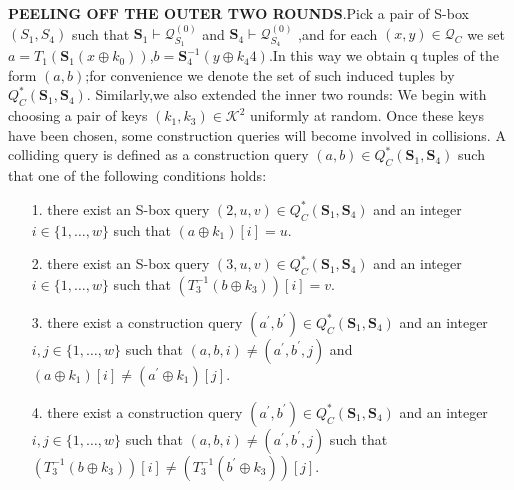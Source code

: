 \noindent
\textbf{PEELING OFF THE OUTER TWO ROUNDS}.Pick a pair of S-box $(S_1,S_4)$ such that $\mathbf{S}_{1} \vdash \mathcal{Q}_{S_{1}}^{(0)}$ and $\mathbf{S}_{4} \vdash
\mathcal{Q}_{S_{4}}^{(0)}$ ,and for each $(x, y) \in \mathcal{Q}_{C}$ we set $a=T_{1}\left(\mathbf{S}_{1}\left(x \oplus k_{0}\right)\right)$,$b=\mathbf{S}_{4}^{-1}\left(y \oplus k_{4}4\right)$.In this way we obtain q tuples of the form $(a,b)$;for convenience we denote the set of such induced tuples by $Q_{C}^{*}\left(\mathbf{S}_{1},\mathbf{S}_{4}\right)$. Similarly,we also extended the inner two rounds:
We begin with choosing a pair of keys $\left(k_{1}, k_{3}\right) \in \mathcal{K}^{2}$ uniformly at random. Once these keys have been chosen, some construction queries will become involved in collisions. A colliding query is defined as a construction query $(a, b) \in Q_{C}^{*}\left(\mathbf{S}_{1},\mathbf{S}_{4}\right)$ such that one of the following conditions holds:

\begin{itemize}
  \item[1.]
  there exist an S-box query $(2, u, v) \in Q_{C}^{*}\left(\mathbf{S}_{1},\mathbf{S}_{4}\right)$ and an integer $i \in\{1, \ldots, w\}$ such that $\left(a \oplus k_{1}\right)[i]=u$.
  \item[2.]
  there exist an S-box query $(3, u, v) \in Q_{C}^{*}\left(\mathbf{S}_{1},\mathbf{S}_{4}\right)$ and an integer $i \in\{1, \ldots, w\}$ such that $\left(T_{3}^{-1}\left(b \oplus k_{3}\right)\right)[i]=v$.
  \item[3.]
  there exist a construction query $\left(a^{\prime}, b^{\prime}\right) \in Q_{C}^{*}\left(\mathbf{S}_{1},\mathbf{S}_{4}\right)$ and an integer $i,j \in\{1, \ldots, w\}$ such that $(a, b, i) \neq\left(a^{\prime}, b^{\prime}, j\right)$ and $\left(a \oplus k_{1}\right)[i] \neq \left(a^{\prime} \oplus k_{1}\right)[j]$.
  \item[4.]
  there exist a construction query $\left(a^{\prime}, b^{\prime}\right) \in Q_{C}^{*}\left(\mathbf{S}_{1},\mathbf{S}_{4}\right)$ and an integer $i,j \in\{1, \ldots, w\}$ such that $(a, b, i) \neq\left(a^{\prime}, b^{\prime}, j\right)$ such that $\left(T_{3}^{-1}\left(b \oplus k_{3}\right)\right)[i] \neq \left(T_{3}^{-1}\left(b^{\prime} \oplus k_{3}\right)\right)[j]$.
\end{itemize}

